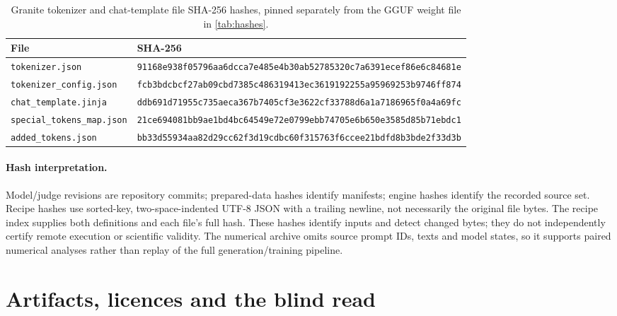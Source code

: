 \documentclass{article}
\begin{document}
\begin{table}[!htbp]
  \caption{Granite tokenizer and chat-template file SHA-256 hashes, pinned
    separately from the GGUF weight file in \cref{tab:hashes}.}
  \label{tab:granitepins}
  \centering\footnotesize
  \begin{tabular}{@{}L{4.3cm}L{12.4cm}@{}}
    \toprule
    File & SHA-256 \\
    \midrule
    \texttt{tokenizer.json} & \texttt{91168e938f05796aa6dcca7e485e4b30ab52785320c7a6391ecef86e6c84681e} \\
    \texttt{tokenizer\_config.json} & \texttt{fcb3bdcbcf27ab09cbd7385c486319413ec3619192255a95969253b9746ff874} \\
    \texttt{chat\_template.jinja} & \texttt{ddb691d71955c735aeca367b7405cf3e3622cf33788d6a1a7186965f0a4a69fc} \\
    \texttt{special\_tokens\_map.json} & \texttt{21ce694081bb9ae1bd4bc64549e72e0799ebb74705e6b650e3585d85b71ebdc1} \\
    \texttt{added\_tokens.json} & \texttt{bb33d55934aa82d29cc62f3d19cdbc60f315763f6ccee21bdfd8b3bde2f33d3b} \\
    \bottomrule
  \end{tabular}
\end{table}

\paragraph{Hash interpretation.} Model/judge revisions are repository commits;
prepared-data hashes identify manifests; engine hashes identify the recorded
source set. Recipe hashes use sorted-key, two-space-indented UTF-8 JSON with
a trailing newline, not necessarily the original file bytes. The recipe
index supplies both definitions and each file's full hash. These hashes
identify inputs and detect changed bytes; they do not independently certify
remote execution or scientific validity. The numerical archive omits source
prompt IDs, texts and model states, so it supports paired numerical analyses
rather than replay of the full generation/training pipeline.

\FloatBarrier
\section{Artifacts, licences and the blind read}
\label{app:artifacts}
\end{document}
